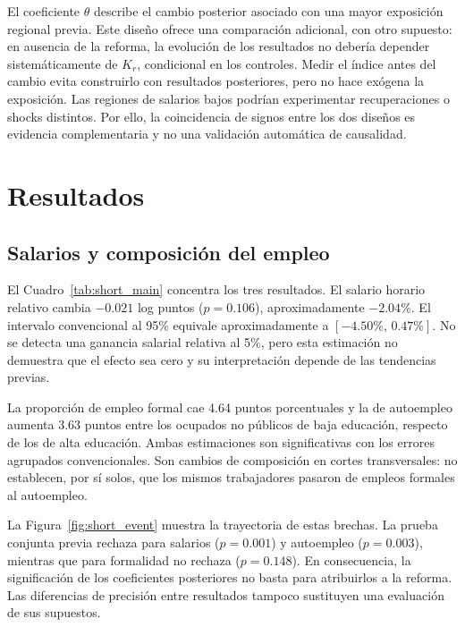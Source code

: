 El coeficiente $\theta$ describe el cambio posterior asociado con una mayor exposición regional previa. Este diseño ofrece una comparación adicional, con otro supuesto: en ausencia de la reforma, la evolución de los resultados no debería depender sistemáticamente de $K_r$, condicional en los controles. Medir el índice antes del cambio evita construirlo con resultados posteriores, pero no hace exógena la exposición. Las regiones de salarios bajos podrían experimentar recuperaciones o shocks distintos. Por ello, la coincidencia de signos entre los dos diseños es evidencia complementaria y no una validación automática de causalidad.

\section{Resultados}

\subsection{Salarios y composición del empleo}

El Cuadro~\ref{tab:short_main} concentra los tres resultados. El salario horario relativo cambia $-0.021$ log puntos ($p=0.106$), aproximadamente $-2.04\%$. El intervalo convencional al 95\% equivale aproximadamente a $[-4.50\%,\,0.47\%]$. No se detecta una ganancia salarial relativa al 5\%, pero esta estimación no demuestra que el efecto sea cero y su interpretación depende de las tendencias previas.

La proporción de empleo formal cae 4.64 puntos porcentuales y la de autoempleo aumenta 3.63 puntos entre los ocupados no públicos de baja educación, respecto de los de alta educación. Ambas estimaciones son significativas con los errores agrupados convencionales. Son cambios de composición en cortes transversales: no establecen, por sí solos, que los mismos trabajadores pasaron de empleos formales al autoempleo.



La Figura~\ref{fig:short_event} muestra la trayectoria de estas brechas. La prueba conjunta previa rechaza para salarios ($p=0.001$) y autoempleo ($p=0.003$), mientras que para formalidad no rechaza ($p=0.148$). En consecuencia, la significación de los coeficientes posteriores no basta para atribuirlos a la reforma. Las diferencias de precisión entre resultados tampoco sustituyen una evaluación de sus supuestos.

